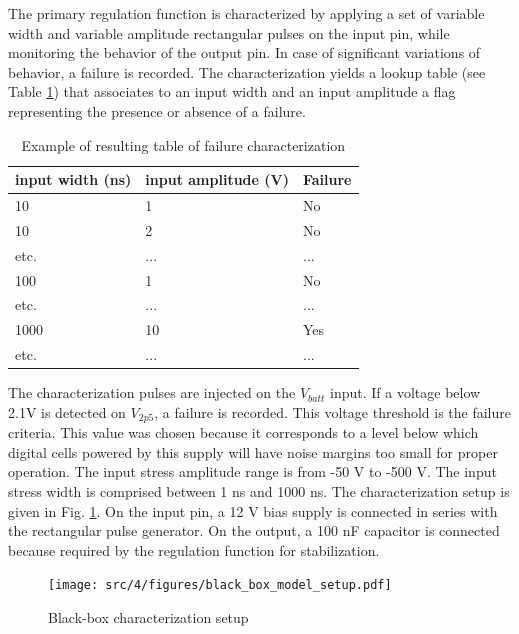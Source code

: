 The primary regulation function is characterized by applying a set of variable width and variable amplitude rectangular pulses on the input pin, while monitoring the behavior of the output pin.
In case of significant variations of behavior, a failure is recorded.
The characterization yields a lookup table (see Table \ref{tab:cz-failure}) that associates to an input width and an input amplitude a flag representing the presence or absence of a failure.

\begin{table}[!h]
\centering
\begin{tabular}{@{}lll@{}}
\toprule
input width (ns) & input amplitude (V) & Failure   \\ \midrule
10               & 1                   & No        \\
10               & 2                   & No        \\
etc.             & ...                 & ...       \\
100              & 1                   & No        \\
etc.             & ...                 & ...       \\
1000             & 10                  & Yes       \\
etc.             & ...                 & ... \\ \bottomrule
\end{tabular}
\caption{Example of resulting table of failure characterization}
\label{tab:cz-failure}
\end{table}

The characterization pulses are injected on the $V_{batt}$ input.
If a voltage below 2.1V is detected on $V_{2p5}$, a failure is recorded.
This voltage threshold is the failure criteria.
This value was chosen because it corresponds to a level below which digital cells powered by this supply will have noise margins too small for proper operation.
The input stress amplitude range is from -50 V to -500 V.
The input stress width is comprised between 1 ns and 1000 ns.
The characterization setup is given in Fig. \ref{fig:cz-black-box-setup}.
On the input pin, a 12 V bias supply is connected in series with the rectangular pulse generator.
On the output, a 100 nF capacitor is connected because required by the regulation function for stabilization.

\begin{figure}[!h]
  \centering
  \texttt{[image: src/4/figures/black\_box\_model\_setup.pdf]}
  \caption{Black-box characterization setup}
  \label{fig:cz-black-box-setup}
\end{figure}

